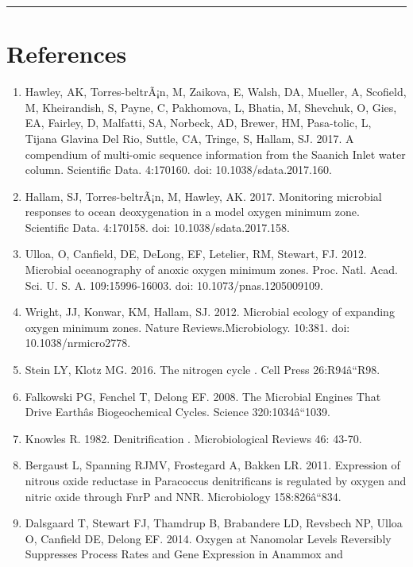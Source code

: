 \documentclass[11 pt,]{article}
\begin{document}
\begin{center}\rule{0.5\linewidth}{\linethickness}\end{center}

\section{References}\label{references}

\begin{enumerate}
\def\labelenumi{\arabic{enumi}.}
\item
  Hawley, AK, Torres-beltrÃ¡n, M, Zaikova, E, Walsh, DA, Mueller, A,
  Scofield, M, Kheirandish, S, Payne, C, Pakhomova, L, Bhatia, M,
  Shevchuk, O, Gies, EA, Fairley, D, Malfatti, SA, Norbeck, AD, Brewer,
  HM, Pasa-tolic, L, Tijana Glavina Del Rio, Suttle, CA, Tringe, S,
  Hallam, SJ. 2017. A compendium of multi-omic sequence information from
  the Saanich Inlet water column. Scientific Data. 4:170160. doi:
  10.1038/sdata.2017.160.
\item
  Hallam, SJ, Torres-beltrÃ¡n, M, Hawley, AK. 2017. Monitoring microbial
  responses to ocean deoxygenation in a model oxygen minimum zone.
  Scientific Data. 4:170158. doi: 10.1038/sdata.2017.158.
\item
  Ulloa, O, Canfield, DE, DeLong, EF, Letelier, RM, Stewart, FJ. 2012.
  Microbial oceanography of anoxic oxygen minimum zones. Proc. Natl.
  Acad. Sci. U. S. A. 109:15996-16003. doi: 10.1073/pnas.1205009109.
\item
  Wright, JJ, Konwar, KM, Hallam, SJ. 2012. Microbial ecology of
  expanding oxygen minimum zones. Nature Reviews.Microbiology. 10:381.
  doi: 10.1038/nrmicro2778.
\item
  Stein LY, Klotz MG. 2016. The nitrogen cycle . Cell Press
  26:R94â``R98.
\item
  Falkowski PG, Fenchel T, Delong EF. 2008. The Microbial Engines That
  Drive Earthâs Biogeochemical Cycles. Science 320:1034â``1039.
\item
  Knowles R. 1982. Denitrification . Microbiological Reviews 46: 43-70.
\item
  Bergaust L, Spanning RJMV, Frostegard A, Bakken LR. 2011. Expression
  of nitrous oxide reductase in Paracoccus denitrificans is regulated by
  oxygen and nitric oxide through FnrP and NNR. Microbiology
  158:826â``834.
\item
  Dalsgaard T, Stewart FJ, Thamdrup B, Brabandere LD, Revsbech NP, Ulloa
  O, Canfield DE, Delong EF. 2014. Oxygen at Nanomolar Levels Reversibly
  Suppresses Process Rates and Gene Expression in Anammox and

\end{enumerate}
\end{document}
